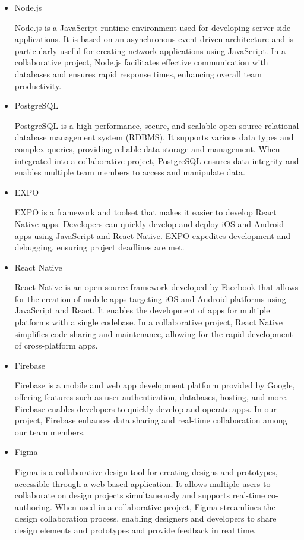 \documentclass[conference]{IEEEtran}
\begin{document}
\begin{itemize}
     \item Node.js \par
    Node.js is a JavaScript runtime environment used for developing server-side applications. It is based on an asynchronous event-driven architecture and is particularly useful for creating network applications using JavaScript. In a collaborative project, Node.js facilitates effective communication with databases and ensures rapid response times, enhancing overall team productivity.
     \item PostgreSQL \par
    PostgreSQL is a high-performance, secure, and scalable open-source relational database management system (RDBMS). It supports various data types and complex queries, providing reliable data storage and management. When integrated into a collaborative project, PostgreSQL ensures data integrity and enables multiple team members to access and manipulate data.
     \item EXPO \par
    EXPO is a framework and toolset that makes it easier to develop React Native apps. Developers can quickly develop and deploy iOS and Android apps using JavaScript and React Native. EXPO expedites development and debugging, ensuring project deadlines are met.
     \item React Native \par
   React Native is an open-source framework developed by Facebook that allows for the creation of mobile apps targeting iOS and Android platforms using JavaScript and React. It enables the development of apps for multiple platforms with a single codebase. In a collaborative project, React Native simplifies code sharing and maintenance, allowing for the rapid development of cross-platform apps.
     \item Firebase \par
    Firebase is a mobile and web app development platform provided by Google, offering features such as user authentication, databases, hosting, and more. Firebase enables developers to quickly develop and operate apps. In our project, Firebase enhances data sharing and real-time collaboration among our team members.
     \item Figma \par
    Figma is a collaborative design tool for creating designs and prototypes, accessible through a web-based application. It allows multiple users to collaborate on design projects simultaneously and supports real-time co-authoring. When used in a collaborative project, Figma streamlines the design collaboration process, enabling designers and developers to share design elements and prototypes and provide feedback in real time.

\end{itemize}
\end{document}
